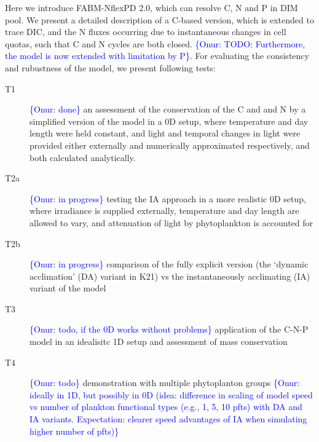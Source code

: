 \documentclass[gmd, manuscript, draft]{copernicus}
\newcommand{\onur}[1]{\textcolor{blue}{\{Onur: #1\}}}
\begin{document}
Here we introduce FABM-NflexPD 2.0, which can resolve C, N and P in DIM pool. We present a detailed description of a C-based version, which is extended to trace DIC, and the N fluxes occurring due to instantaneous changes in cell quotas, such that C and N cycles are both closed. \onur{TODO: Furthermore, the model is now extended with limitation by P}. For evaluating the consistency and rubustness of the model, we present following tests:
\begin{description}
 \item [T1] \onur{done} an assessment of the conservation of the C and and N by a simplified version of the model in a 0D setup, where temperature and day length were held constant, and light and temporal changes in light were provided either externally and numerically approximated respectively, and both calculated analytically.
 \item [T2a] \onur{in progress} testing the IA approach in a more realistic 0D setup, where irradiance is supplied externally, temperature and day length are allowed to vary, and attenuation of light by phytoplankton is accounted for
 \item [T2b] \onur{in progress} comparison of the fully explicit version (the `dynamic acclimation' (DA) variant in K21) vs the instantaneously acclimating (IA) variant of the model 
 \item [T3] \onur{todo, if the 0D works without problems} application of the C-N-P model in an idealisitc 1D setup and assessment of mass conservation
 \item [T4] \onur{todo} demonstration with multiple phytoplanton groups \onur{ideally in 1D, but possibly in 0D (idea: difference in scaling of model speed vs number of plankton functional types (e.g., 1, 5, 10 pfts) with DA and IA variants. Expectation: clearer speed advantages of IA when simulating higher number of pfts)}
\end{description}
\end{document}
